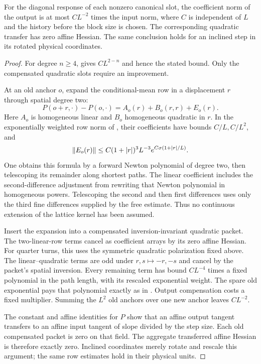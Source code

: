 \begin{lemma}
\label{lem:rg-canonical-contraction}
For the diagonal response of each nonzero canonical slot, the
coefficient norm of the output is at most $CL^{-2}$ times the input
norm, where $C$ is independent of $L$ and the history before the
block size is chosen.  The corresponding quadratic transfer has
zero affine Hessian.  The same conclusion holds for an inclined
step in its rotated physical coordinates.
\end{lemma}

\begin{proof}
For degree $n\ge4$,  gives
$CL^{2-n}$ and hence the stated bound.  Only the compensated quadratic
slots require an improvement.

At an old anchor $o$, expand the conditional-mean row in a displacement
$r$ through spatial degree two:
\[
 P(o+r,\cdot)-P(o,\cdot)
       =A_o(r)+B_o(r,r)+E_o(r).
\]
Here $A_o$ is homogeneous linear and $B_o$ homogeneous quadratic in
$r$.  In the exponentially weighted row norm of
, their coefficients have bounds $C/L,C/L^2$,
and
\[
 \left\lVert E_o(r)\right\rVert\le
 C(1+|r|)^3L^{-3}e^{C\sigma(1+|r|/L)}.
\]
One obtains this formula by a forward Newton polynomial of degree
two, then telescoping its remainder along shortest paths.  The
linear coefficient includes the second-difference adjustment from
rewriting that Newton polynomial in homogeneous powers.  Telescoping
the second and then first differences uses only the third fine
differences supplied by the free estimate.  Thus no continuous
extension of the lattice kernel has been assumed.

Insert the expansion into a compensated inversion-invariant quadratic
packet.  The two-linear-row terms cancel as coefficient arrays by
its zero affine Hessian.  For quarter turns, this uses the symmetric
quadratic polarization fixed above.  The linear--quadratic terms are
odd under $r,s\mapsto-r,-s$ and cancel by the packet's spatial
inversion.  Every remaining term has bound $CL^{-4}$ times a fixed
polynomial in the path length, with its rescaled exponential weight.
The spare old exponential pays that polynomial exactly as in
.  Output compensation costs a
fixed multiplier.  Summing the $L^2$ old anchors over one new anchor
leaves $CL^{-2}$.

The constant and affine identities for $P$ show that an affine
output tangent transfers to an affine input tangent of slope divided
by the step size.  Each old compensated packet is zero on that
field.  The aggregate transferred affine Hessian is therefore exactly
zero.  Inclined coordinates merely rotate and rescale this argument;
the same row estimates hold in their physical units.
\end{proof}

